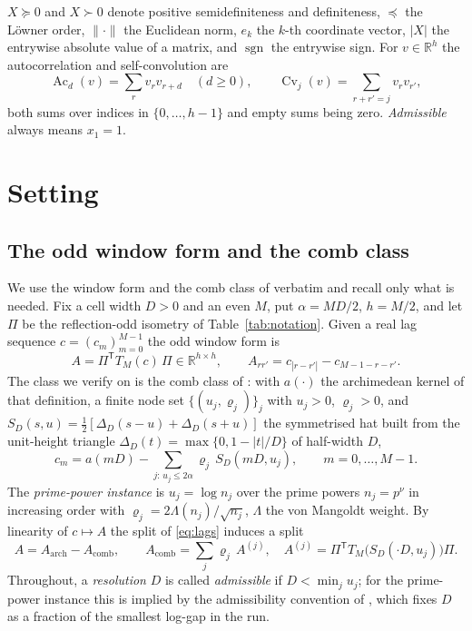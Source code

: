 \documentclass[11pt,a4paper]{article}
\theoremstyle{plain}
\theoremstyle{definition}
\newcommand{\R}{\mathbb{R}}
\newcommand{\T}{\mathsf{T}}
\newcommand{\Tm}[1]{T_{#1}}
\newcommand{\PSD}{\succeq 0}
\newcommand{\PD}{\succ 0}
\newcommand{\Ac}{\operatorname{Ac}}
\newcommand{\Cv}{\operatorname{Cv}}
\DeclareMathOperator{\sgn}{sgn}
\begin{document}
$X\PSD$ and $X\PD$ denote positive semidefiniteness and definiteness,
$\preceq$ the L\"owner order, $\lVert\cdot\rVert$ the Euclidean norm,
$e_k$ the $k$-th coordinate vector, $|X|$ the entrywise absolute value of a
matrix, and $\sgn$ the entrywise sign. For $v\in\R^{h}$ the autocorrelation and
self-convolution are
\begin{equation}
\label{eq:accv}
  \Ac_d(v)=\sum_{r}v_rv_{r+d}\quad(d\ge0),
  \qquad
  \Cv_j(v)=\sum_{r+r'=j}v_rv_{r'},
\end{equation}
both sums over indices in $\{0,\dots,h-1\}$ and empty sums being zero.
\emph{Admissible} always means $x_1=1$.

\section{Setting}
\label{sec:setting}

\subsection{The odd window form and the comb class}
\label{sec:window}

We use the window form and the comb class of \cite{PaperI} verbatim and recall
only what is needed. Fix a cell width $D>0$ and an even $M$, put $\alpha=MD/2$,
$h=M/2$, and let $\Pi$ be the reflection-odd isometry of
Table~\ref{tab:notation}. Given a real lag sequence $c=(c_m)_{m=0}^{M-1}$ the
odd window form is
\begin{equation}
\label{eq:Adef}
  A=\Pi^{\T}\Tm{M}(c)\,\Pi\in\R^{h\times h},
  \qquad
  A_{rr'}=c_{|r-r'|}-c_{M-1-r-r'} .
\end{equation}
The class we verify on is the comb class of \cite[Def.~2.6]{PaperI}: with
$a(\cdot)$ the archimedean kernel of that definition, a finite node set
$\{(u_j,\varrho_j)\}_j$ with $u_j>0$, $\varrho_j>0$, and
$S_D(s,u)=\tfrac12[\Delta_D(s-u)+\Delta_D(s+u)]$ the symmetrised hat built from
the unit-height triangle $\Delta_D(t)=\max\{0,1-|t|/D\}$ of half-width $D$,
\begin{equation}
\label{eq:lags}
  c_m=a(mD)-\sum_{j:\,u_j\le2\alpha}\varrho_j\,S_D(mD,u_j),
  \qquad m=0,\dots,M-1 .
\end{equation}
The \emph{prime-power instance} is $u_j=\log n_j$ over the prime powers
$n_j=p^{\nu}$ in increasing order with $\varrho_j=2\Lambda(n_j)/\sqrt{n_j}$,
$\Lambda$ the von Mangoldt weight. By linearity of $c\mapsto A$ the split of
\eqref{eq:lags} induces a split
\begin{equation}
\label{eq:Asplit}
  A=A_{\mathrm{arch}}-A_{\mathrm{comb}},
  \qquad
  A_{\mathrm{comb}}=\sum_{j}\varrho_j\,A^{(j)},
  \quad
  A^{(j)}=\Pi^{\T}\Tm{M}\bigl(S_D(\cdot D,u_j)\bigr)\Pi .
\end{equation}
Throughout, a \emph{resolution} $D$ is called \emph{admissible} if
$D<\min_ju_j$; for the prime-power instance this is implied by the admissibility
convention of \cite[Def.~5.1]{PaperI}, which fixes $D$ as a fraction of the
smallest log-gap in the run.
\end{document}
